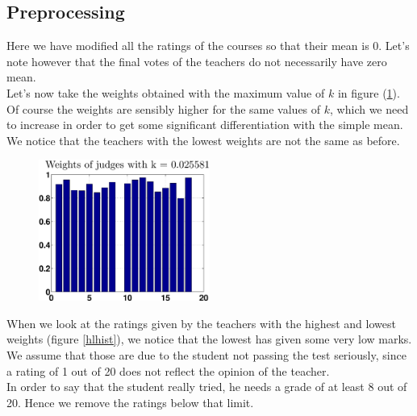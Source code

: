 \documentclass[12pt,a4paper]{article}
\begin{document}
\subsection*{Preprocessing}
Here we have modified all the ratings of the courses so that their mean is 0. Let's note however that the final votes of the teachers do not necessarily have zero mean. \\
Let's now take the weights obtained with the maximum value of $k$ in figure (\ref{weightprocess}). Of course the weights are sensibly higher for the same values of $k$, which we need to increase in order to get some significant differentiation with the simple mean. We notice that the teachers with the lowest weights are not the same as before.

\begin{figure}[h!]
\centering
\includegraphics[width = 0.5\textwidth]{preprocess/ppweightsk3f9a31ee697a4e60.eps}
\caption{\label{weightprocess}}
\end{figure}

When we look at the ratings given by the teachers with the highest and lowest weights (figure \ref{hlhist}), we notice that the lowest has given some very low marks. We assume that those are due to the student not passing the test seriously, since a rating of 1 out of 20 does not reflect the opinion of the teacher.\\
In order to say that the student really tried, he needs a grade of at least 8 out of 20. Hence we remove the ratings below that limit.
\end{document}
